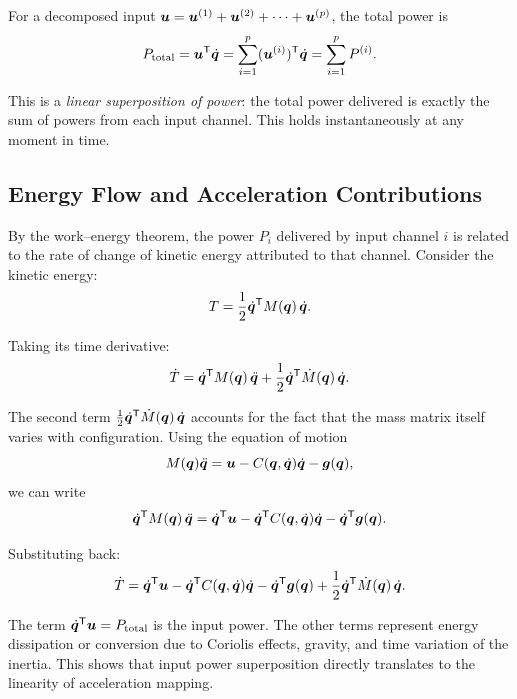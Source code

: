 For a decomposed input $\bm{u} = \bm{u}^{(1)} + \bm{u}^{(2)} + \cdots + \bm{u}^{(p)}$, the total
power is
\begin{equation}
P_{\text{total}} = \bm{u}^{\mathsf{T}} \dot{\bm{q}} = \sum_{i=1}^p (\bm{u}^{(i)})^{\mathsf{T}} \dot{\bm{q}} = \sum_{i=1}^p P^{(i)}.
\label{eq:ch3:power-superposition}
\end{equation}

This is a \emph{linear superposition of power}: the total power delivered is exactly the sum of
powers from each input channel. This holds instantaneously at any moment in time.

\subsection{Energy Flow and Acceleration Contributions}

By the work--energy theorem, the power $P_i$ delivered by input channel $i$ is related to the
rate of change of kinetic energy attributed to that channel. Consider the kinetic energy:
\begin{equation}
T = \frac{1}{2}\dot{\bm{q}}^{\mathsf{T}} M(\bm{q})\,\dot{\bm{q}}.
\end{equation}

Taking its time derivative:
\begin{equation}
\dot T = \dot{\bm{q}}^{\mathsf{T}} M(\bm{q})\,\ddot{\bm{q}} + \frac{1}{2}\dot{\bm{q}}^{\mathsf{T}} \dot M(\bm{q})\,\dot{\bm{q}}.
\label{eq:ch3:energy-rate}
\end{equation}

The second term $\frac{1}{2}\dot{\bm{q}}^{\mathsf{T}} \dot M(\bm{q})\,\dot{\bm{q}}$ accounts for the fact that the mass
matrix itself varies with configuration. Using the equation of motion
\begin{equation}
M(\bm{q})\ddot{\bm{q}} = \bm{u} - C(\bm{q},\dot{\bm{q}})\dot{\bm{q}} - \bm{g}(\bm{q}),
\end{equation}
we can write
\begin{equation}
\dot{\bm{q}}^{\mathsf{T}} M(\bm{q})\,\ddot{\bm{q}} = \dot{\bm{q}}^{\mathsf{T}} \bm{u} - \dot{\bm{q}}^{\mathsf{T}} C(\bm{q},\dot{\bm{q}})\dot{\bm{q}} - \dot{\bm{q}}^{\mathsf{T}} \bm{g}(\bm{q}).
\end{equation}

Substituting back:
\begin{equation}
\dot T = \dot{\bm{q}}^{\mathsf{T}} \bm{u} - \dot{\bm{q}}^{\mathsf{T}} C(\bm{q},\dot{\bm{q}})\dot{\bm{q}} - \dot{\bm{q}}^{\mathsf{T}} \bm{g}(\bm{q})
+ \frac{1}{2}\dot{\bm{q}}^{\mathsf{T}} \dot M(\bm{q})\,\dot{\bm{q}}.
\label{eq:ch3:energy-decomposition}
\end{equation}

The term $\dot{\bm{q}}^{\mathsf{T}} \bm{u} = P_{\text{total}}$ is the input power. The other terms represent
energy dissipation or conversion due to Coriolis effects, gravity, and time variation of the
inertia. This shows that input power superposition directly translates to the linearity of
acceleration mapping.

